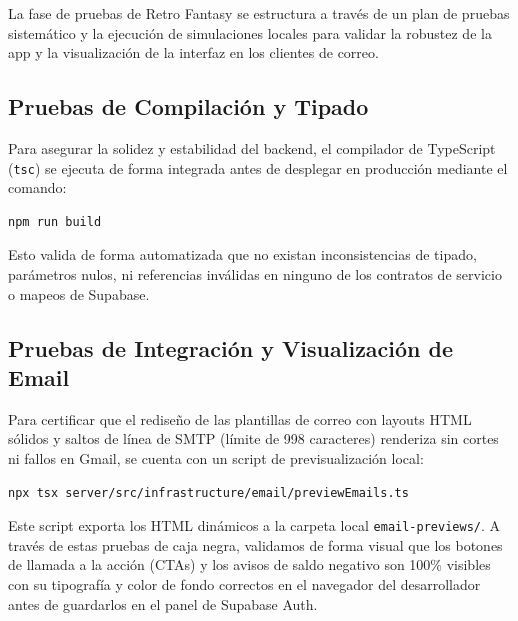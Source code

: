 La fase de pruebas de Retro Fantasy se estructura a través de un plan de pruebas sistemático y la ejecución de simulaciones locales para validar la robustez de la app y la visualización de la interfaz en los clientes de correo.

\subsection{Pruebas de Compilación y Tipado}
Para asegurar la solidez y estabilidad del backend, el compilador de TypeScript (\texttt{tsc}) se ejecuta de forma integrada antes de desplegar en producción mediante el comando:
\begin{lstlisting}[language=bash]
npm run build
\end{lstlisting}
Esto valida de forma automatizada que no existan inconsistencias de tipado, parámetros nulos, ni referencias inválidas en ninguno de los contratos de servicio o mapeos de Supabase.

\subsection{Pruebas de Integración y Visualización de Email}
Para certificar que el rediseño de las plantillas de correo con layouts HTML sólidos y saltos de línea de SMTP (límite de 998 caracteres) renderiza sin cortes ni fallos en Gmail, se cuenta con un script de previsualización local:
\begin{lstlisting}[language=bash]
npx tsx server/src/infrastructure/email/previewEmails.ts
\end{lstlisting}
Este script exporta los HTML dinámicos a la carpeta local \texttt{email-previews/}. A través de estas pruebas de caja negra, validamos de forma visual que los botones de llamada a la acción (CTAs) y los avisos de saldo negativo son 100\% visibles con su tipografía y color de fondo correctos en el navegador del desarrollador antes de guardarlos en el panel de Supabase Auth.
